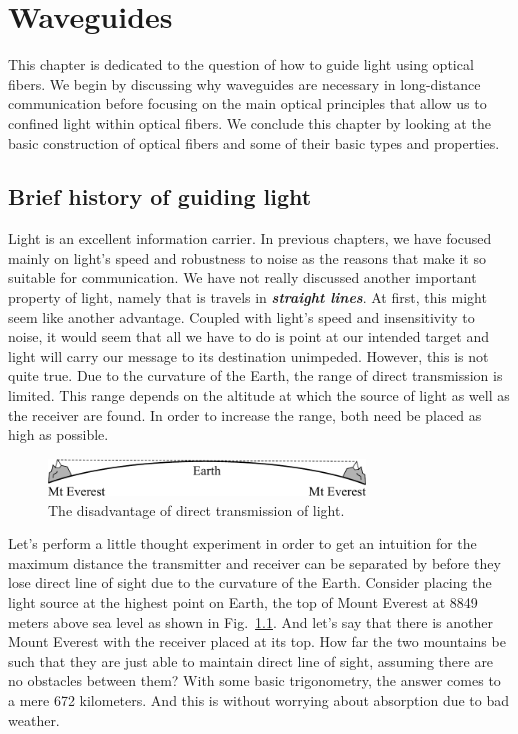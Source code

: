 \chapter{Waveguides}
\label{sec:7_waveguides}

This chapter is dedicated to the question of how to guide light using optical fibers.
We begin by discussing why waveguides are necessary in long-distance communication before focusing on the main optical principles that allow us to confined light within optical fibers.
We conclude this chapter by looking at the basic construction of optical fibers and some of their basic types and properties.

\section{Brief history of guiding light}
\label{sec:7-1_history}

Light is an excellent information carrier.
In previous chapters, we have focused mainly on light's speed and robustness to noise as the reasons that make it so suitable for communication.
We have not really discussed another important property of light, namely that is travels in \textit{\textbf{straight lines}}.
At first, this might seem like another advantage.
Coupled with light's speed and insensitivity to noise, it would seem that all we have to do is point at our intended target and light will carry our message to its destination unimpeded.
However, this is not quite true.
Due to the curvature of the Earth, the range of direct transmission is limited.
This range depends on the altitude at which the source of light as well as the receiver are found.
In order to increase the range, both need be placed as high as possible.

\begin{figure}[H]
    \centering
    \includegraphics[width=0.75\textwidth]{lesson7/7-1_everest.pdf}
    \caption[Two Everests]{The disadvantage of direct transmission of light.}
    \label{fig:7-1_everest}
\end{figure}

Let's perform a little thought experiment in order to get an intuition for the maximum distance the transmitter and receiver can be separated by before they lose direct line of sight due to the curvature of the Earth.
Consider placing the light source at the highest point on Earth, the top of Mount Everest at 8849 meters above sea level as shown in Fig.~\ref{fig:7-1_everest}.
And let's say that there is another Mount Everest with the receiver placed at its top.
How far the two mountains be such that they are just able to maintain direct line of sight, assuming there are no obstacles between them?
With some basic trigonometry, the answer comes to a mere 672 kilometers.
And this is without worrying about absorption due to bad weather.

